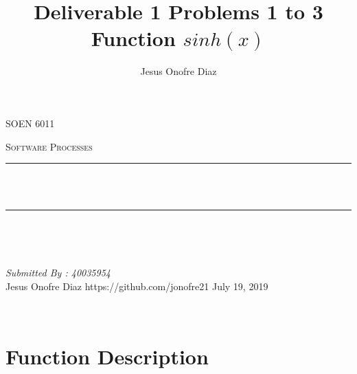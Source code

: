 \documentclass[12pt]{report}
\title{Deliverable 1 Problems 1 to 3 Function $sinh(x)$ }
\author{Jesus Onofre Diaz}
\date{}
\makeatletter
\let\thetitle\@title
\makeatother
\begin{document}

\begin{titlepage}
	\centering
    \vspace*{0.5 cm}
\begin{center}    \textsc{\Large   SOEN 6011}\\[2.0 cm]	\end{center}%
	\textsc{\Large Software Processes }\\[0.5 cm]				%
	\rule{\linewidth}{0.2 mm} \\[0.4 cm]
	{ \huge \bfseries \thetitle}\\
	\rule{\linewidth}{0.2 mm} \\[1.5 cm]
	
	\begin{minipage}{0.4\textwidth}
		\begin{flushleft} \large
			\end{flushleft}
			\end{minipage}~
			\begin{minipage}{0.4\textwidth}
            
			\begin{flushright} \large
			\emph{Submitted By : 40035954} \\
		Jesus Onofre Diaz
		https://github.com/jonofre21
		\break
			July 19, 2019
		\end{flushright}
	
           
	\end{minipage}\\[2 cm]
	

\end{titlepage}


\tableofcontents
\pagebreak

\renewcommand{\thesection}{\arabic{section}}
\section{Function Description}
 
\end{document}
